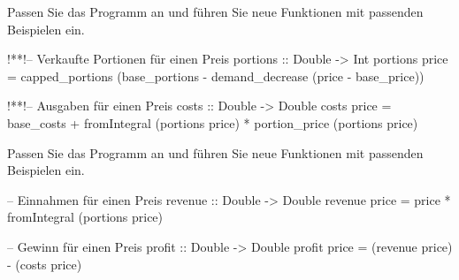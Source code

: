 \addtocounter{exercise}{-1}\addtocounter{solve}{-1}%
\begin{frame}\onslide<+->%
    \begin{exercise}[c)]
        Passen Sie das Programm an und führen Sie neue Funktionen mit passenden Beispielen ein.
    \end{exercise}
    \begin{solve}
    \begin{plainhaskell}
!*\onslide<+->*!-- Verkaufte Portionen für einen Preis
portions :: Double -> Int
portions price = capped_portions (base_portions - demand_decrease (price - base_price))

!*\onslide<+->*!-- Ausgaben für einen Preis
costs :: Double -> Double
costs price = base_costs + fromIntegral (portions price) * portion_price (portions price)
    \end{plainhaskell}
    \end{solve}
\end{frame}
\addtocounter{exercise}{-1}\addtocounter{solve}{-1}%
\begin{frame}\onslide<+->%
    \begin{exercise}[c)]
        Passen Sie das Programm an und führen Sie neue Funktionen mit passenden Beispielen ein.
    \end{exercise}
    \begin{solve}
    \begin{plainhaskell}
-- Einnahmen für einen Preis 
revenue :: Double -> Double
revenue price = price * fromIntegral (portions price)

-- Gewinn für einen Preis
profit :: Double -> Double
profit price = (revenue price) - (costs price)
    \end{plainhaskell}
    \end{solve}
\end{frame}